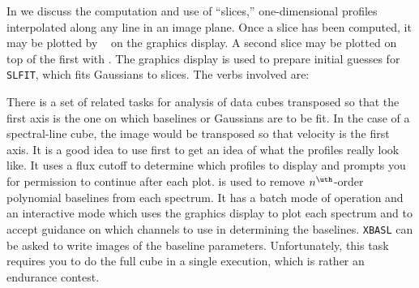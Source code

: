      In  we discuss the computation and use of ``slices,''
one-dimensional profiles interpolated along any line in an image
plane.  Once a slice has been computed, it may be plotted by {\tt
{}} on the graphics display.  A second slice may be plotted on
top of the first with {\tt {}}\@.  The graphics
display is used to prepare initial guesses for {\tt SLFIT}, which fits
Gaussians to slices.  The verbs involved are:


     There is a set of related tasks for analysis of data cubes
transposed so that the first axis is the one on which baselines or
Gaussians are to be fit.  In the case of a spectral-line cube, the
image would be transposed so that velocity is the first axis.  It is a
good idea to use {\tt {}} first to get an idea of what the
profiles really look like.  It uses a flux cutoff to determine which
profiles to display and prompts you for permission to continue after
each plot. {\tt {}} is used to remove $n^{\uth}$-order
polynomial baselines from each spectrum.  It has a batch mode of
operation and an interactive mode which uses the graphics display to
plot each spectrum and to accept guidance on which channels to use in
determining the baselines.  {\tt XBASL} can be asked to write images
of the baseline parameters.  Unfortunately, this task requires you to
do the full cube in a single execution, which is rather an endurance
contest. 
\vfill\eject

